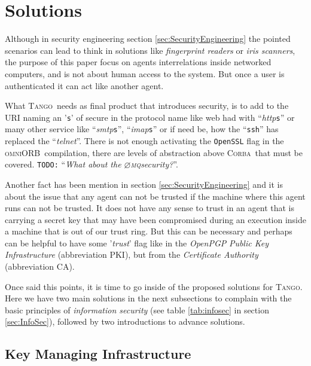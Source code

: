 \documentclass[10pt,a4paper,twoside]{llncs}
\newcommand{\todo}[1]{\texttt{\color{red}TODO:} ``\emph{#1}''}
\newcommand{\tango}{\textsc{Tango}}
\newcommand{\corba}{\textsc{Corba}}
\newcommand{\omniorb}{\textsc{omniORB}}
\newcommand{\zmq}{\textsc{$\varnothing$mq}}
\begin{document}
\section{Solutions}\label{sec:solutions}

Although in security engineering section \ref{sec:SecurityEngineering} the pointed scenarios can lead to think in solutions like \emph{fingerprint readers} or \emph{iris scanners}, the purpose of this paper focus on agents interrelations inside networked computers, and is not about human access to the system. But once a user is authenticated it can act like another agent.

What \tango\, needs as final product that introduces security, is to add to the URI naming an '{\tt s}' of secure in the protocol name like web had with ``\emph{http}{\tt s}'' or many other service like ``\emph{smtp}{\tt s}'', ``\emph{imap}{\tt s}'' or if need be, how the ``{\tt ssh}'' has replaced the ``\emph{telnet}''. There is not enough activating the {\tt OpenSSL} flag in the \omniorb\, compilation, there are levels of abstraction above \corba\, that must be covered. \todo{What about the \zmq security?}.

Another fact has been mention in section \ref{sec:SecurityEngineering} and it is about the issue that any agent can not be trusted if the machine where this agent runs can not be trusted. It does not have any sense to trust in an agent that is carrying a secret key that may have been compromised during an execution inside a machine that is out of our trust ring. But this can be necessary and perhaps can be helpful to have some '\emph{trust}' flag like in the \emph{OpenPGP} \emph{Public Key Infrastructure} (abbreviation PKI), but from the \emph{Certificate Authority} (abbreviation CA).

Once said this points, it is time to go inside of the proposed solutions for \tango. Here we have two main solutions in the next subsections to complain with the basic principles of \emph{information security} (see table \ref{tab:infosec} in section \ref{sec:InfoSec}), followed by two introductions to advance solutions.

\subsection{Key Managing Infrastructure}
\end{document}
